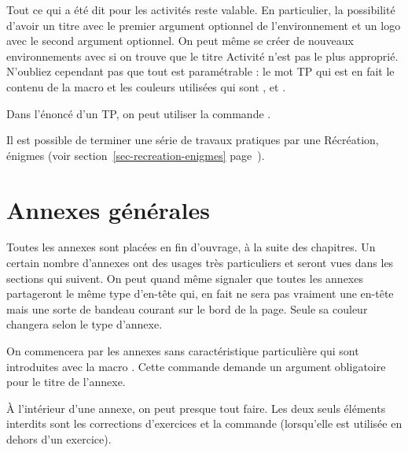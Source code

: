 \documentclass[nocrop]{sesamanuel}
\begin{document}
Tout ce qui a été dit pour les activités reste valable. En
particulier, la possibilité d'avoir un titre avec le premier argument
optionnel de l'environnement et un logo avec le second argument
optionnel. On peut même se créer de nouveaux environnements avec
 si on trouve que le titre \og Activité \fg{}
n'est pas le plus approprié. N'oubliez cependant pas que tout est
paramétrable : le mot \og TP \fg{} qui est en fait le contenu de
la macro  et les couleurs utilisées qui sont
,  et .

Dans l'énoncé d'un TP, on peut utiliser la commande .

Il est possible de terminer une série de travaux pratiques par une
Récréation, énigmes (voir section~\ref{sec-recreation-enigmes}
page~\pageref{sec-recreation-enigmes}).

\section{Annexes générales}
\label{sec-annexes-generales}
Toutes les annexes sont placées en fin d'ouvrage, à la suite des
chapitres. Un certain nombre d'annexes ont des usages très
particuliers et seront vues dans les sections qui suivent. On peut
quand même signaler que toutes les annexes partageront le même type
d'en-tête qui, en fait ne sera pas vraiment une en-tête mais une sorte
de bandeau courant sur le bord de la page. Seule sa couleur changera
selon le type d'annexe.

On commencera par les annexes sans caractéristique particulière qui
sont introduites avec la macro . Cette commande demande un
argument obligatoire pour le titre de l'annexe.

À l'intérieur d'une annexe, on peut presque tout faire. Les deux
seuls éléments interdits sont les corrections d'exercices et la
commande  (lorsqu'elle est utilisée en dehors d'un
exercice).
\end{document}
